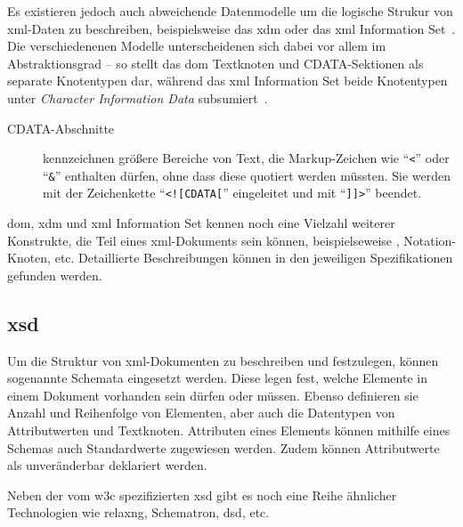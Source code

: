 Es existieren jedoch auch abweichende Datenmodelle um die logische Strukur von \acrshort{xml}-Daten zu beschreiben, beispielsweise das \acrfull{xdm} oder das \acrshort{xml} Information Set~\cite{xmlinfoset}. Die verschiedenenen Modelle unterscheidenen sich dabei vor allem im Abstraktionsgrad -- so stellt das \gls{dom} Textknoten und CDATA-Sektionen als separate Knotentypen dar, während das \acrshort{xml} Information Set beide Knotentypen unter \emph{Character Information Data} subsumiert~\cite[Abschnitt 2.6]{xmlinfoset}.

\begin{description}
    \item[CDATA-Abschnitte] kennzeichnen größere Bereiche von Text, die Markup-Zeichen wie \enquote{\texttt{<}} oder \enquote{\texttt{\&}} enthalten dürfen, ohne dass diese quotiert werden müssten. Sie werden mit der Zeichenkette \enquote{\texttt{<![CDATA[}} eingeleitet und mit \enquote{\texttt{]]>}} beendet.~\cite[Abschnitt 2.7]{xml}
\end{description}

\gls{dom}, \acrshort{xdm} und \acrshort{xml} Information Set kennen noch eine Vielzahl weiterer Konstrukte, die Teil eines \acrshort{xml}-Dokuments sein können, beispielseweise , Notation-Knoten, etc. Detaillierte Beschreibungen können in den jeweiligen Spezifikationen gefunden werden.~\cite{dom,xmlinfoset,xdm,xml}


\subsection{\acrfull{xsd}}
\label{sec:xsd}

Um die Struktur von \acrshort{xml}-Dokumenten zu beschreiben und festzulegen, können sogenannte Schemata eingesetzt werden. Diese legen fest, welche Elemente in einem Dokument vorhanden sein dürfen oder müssen. Ebenso definieren sie Anzahl und Reihenfolge von Elementen, aber auch die Datentypen von Attributwerten und Textknoten. Attributen eines Elements können mithilfe eines Schemas auch Standardwerte zugewiesen werden. Zudem können Attributwerte als unveränderbar deklariert werden.

Neben der vom \gls{w3c} spezifizierten \acrfull{xsd} gibt es noch eine Reihe ähnlicher Technologien wie \acrshort{relaxng}, Schematron, \gls{dsd}, etc.

